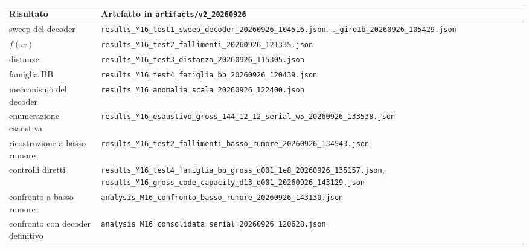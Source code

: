 \begin{onehalfspace}
\begin{table}[H]
\centering
\footnotesize
\begin{tabularx}{\textwidth}{lX}
\toprule
\textbf{Risultato} & \textbf{Artefatto in \texttt{artifacts/v2\_\allowbreak{}20260926}} \\
\midrule
sweep del decoder & \texttt{results\_\allowbreak{}M16\_\allowbreak{}test1\_\allowbreak{}sweep\_\allowbreak{}decoder\_\allowbreak{}20260926\_\allowbreak{}104516.json}, \texttt{\dots\_\allowbreak{}giro1b\_\allowbreak{}20260926\_\allowbreak{}105429.json} \\
$f(w)$ & \texttt{results\_\allowbreak{}M16\_\allowbreak{}test2\_\allowbreak{}fallimenti\_\allowbreak{}20260926\_\allowbreak{}121335.json} \\
distanze & \texttt{results\_\allowbreak{}M16\_\allowbreak{}test3\_\allowbreak{}distanza\_\allowbreak{}20260926\_\allowbreak{}115305.json} \\
famiglia BB & \texttt{results\_\allowbreak{}M16\_\allowbreak{}test4\_\allowbreak{}famiglia\_\allowbreak{}bb\_\allowbreak{}20260926\_\allowbreak{}120439.json} \\
meccanismo del decoder & \texttt{results\_\allowbreak{}M16\_\allowbreak{}anomalia\_\allowbreak{}scala\_\allowbreak{}20260926\_\allowbreak{}122400.json} \\
enumerazione esaustiva & \texttt{results\_\allowbreak{}M16\_\allowbreak{}esaustivo\_\allowbreak{}gross\_\allowbreak{}144\_\allowbreak{}12\_\allowbreak{}12\_\allowbreak{}serial\_\allowbreak{}w5\_\allowbreak{}20260926\_\allowbreak{}133538.json} \\
ricostruzione a basso rumore & \texttt{results\_\allowbreak{}M16\_\allowbreak{}test2\_\allowbreak{}fallimenti\_\allowbreak{}basso\_\allowbreak{}rumore\_\allowbreak{}20260926\_\allowbreak{}134543.json} \\
controlli diretti & \texttt{results\_\allowbreak{}M16\_\allowbreak{}test4\_\allowbreak{}famiglia\_\allowbreak{}bb\_\allowbreak{}gross\_\allowbreak{}q001\_\allowbreak{}1e8\_\allowbreak{}20260926\_\allowbreak{}135157.json}, \texttt{results\_\allowbreak{}M16\_\allowbreak{}gross\_\allowbreak{}code\_\allowbreak{}capacity\_\allowbreak{}d13\_\allowbreak{}q001\_\allowbreak{}20260926\_\allowbreak{}143129.json} \\
confronto a basso rumore & \texttt{analysis\_\allowbreak{}M16\_\allowbreak{}confronto\_\allowbreak{}basso\_\allowbreak{}rumore\_\allowbreak{}20260926\_\allowbreak{}143130.json} \\
confronto con decoder definitivo & \texttt{analysis\_\allowbreak{}M16\_\allowbreak{}consolidata\_\allowbreak{}serial\_\allowbreak{}20260926\_\allowbreak{}120628.json} \\

\end{tabularx}
\end{table}
\end{onehalfspace}
